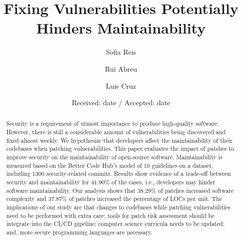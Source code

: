 \documentclass[smallextended]{svjour3}       %
\begin{document}
\title{Fixing Vulnerabilities Potentially Hinders Maintainability}

\author{Sofia Reis         \and
        Rui Abreu           \and
        Luis Cruz
}


\date{Received: date / Accepted: date}


\maketitle

\begin{abstract}
Security is a requirement of utmost importance to produce 
high-quality software. However, there is still a considerable amount 
of vulnerabilities being discovered and fixed almost weekly. We 
hypothesize that developers affect the maintainability of their 
codebases when patching vulnerabilities. This paper evaluates the 
impact of patches to improve security on the maintainability of 
open-source software. Maintainability is measured based on the 
Better Code Hub’s model of 10 guidelines on a dataset, including 
1300 security-related commits. Results show evidence of a trade-off 
between security and maintainability for $41.90\%$ of the cases, i.e., developers 
may hinder software maintainability. Our analysis shows that $38.29\%$ of patches increased
software complexity and $37.87\%$ of patches increased the percentage 
of LOCs per unit. The implications of our study 
are that changes to codebases while patching vulnerabilities need to 
be performed with extra care; tools for patch risk assessment should 
be integrate into the CI/CD pipeline; computer science curricula 
needs to be updated; and, more secure programming languages are 
necessary.
\end{abstract}
\end{document}
